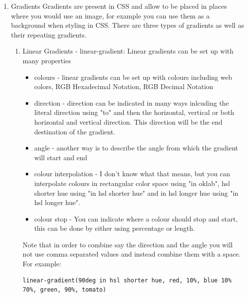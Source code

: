 \documentclass[11pt]{article}
\begin{document}
\begin{enumerate}
\begin{enumerate}
\begin{verbatim}
margin: top right bottom left
\end{verbatim}
However if only three values are specified, they instead follow:
\begin{verbatim}
margin: top sides bottom
\end{verbatim}
If only two values are input, then the syntax follows:
\begin{verbatim}
margin: top/bottom sides
\end{verbatim}
If only one value is input then it applies to all sides of the element.
\end{enumerate}
\item Gradients
Gradients are present in CSS and allow to be placed in places where you would use an image, for
example you can use them as a background when styling in CSS. There are three types of gradients
as well as their repeating gradients.
\begin{enumerate}
\item Linear Gradients - linear-gradient:
Linear gradients can be set up with many properties
\begin{itemize}
\item colours - linear gradients can be set up with colours including web colors, RGB Hexadecimal
Notation, RGB Decimal Notation
\item direction -  direction can be indicated in many ways inlcuding the literal direction using
"to" and then the horizontal, vertical or both horizontal and vertical direction. This
direction will be the end destination of the gradient.
\item angle - another way is to describe the angle from which the gradient will start and end
\item colour interpolation - I don't know what that means, but you can interpolate colours in
rectangular color space using "in oklab", hsl shorter hue using "in hsl shorter hue" and in
hsl longer hue using "in hsl longer hue".
\item colour stop - You can indicate where a colour should stop and start, this can be done by
either using percentage or length.
\end{itemize}
Note that in order to combine say the direction and the angle you will not use comma separated
values and instead combine them with a space. For example:
\begin{verbatim}
linear-gradient(90deg in hsl shorter hue, red, 10%, blue 10% 70%, green, 90%, tomato)
\end{verbatim}

\end{enumerate}
\end{enumerate}
\end{document}
